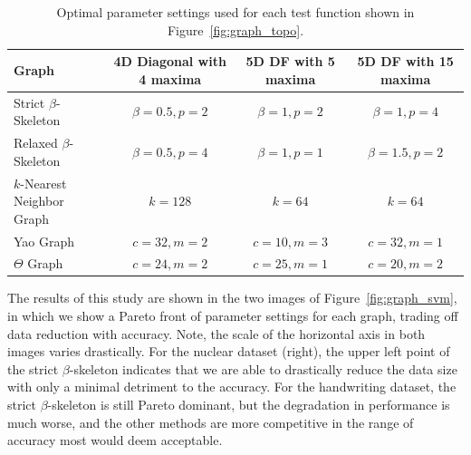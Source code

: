\begin{table}[t]
    \scriptsize
    \centering
    \caption[Optimal graph parameters used in Figure~\ref{fig:graph_topo}]{Optimal parameter settings used for each test function shown in Figure~\ref{fig:graph_topo}.}
    \begin{tabular}{| l | c | c | c |}
    \hline
    \textbf{Graph}  & \textbf{4D Diagonal with 4 maxima} & \textbf{5D DF with 5 maxima} & \textbf{5D DF with 15 maxima} \\
    \hline
    Strict $\beta$-Skeleton & $\beta=0.5, p=2$ & $\beta=1, p=2$  & $\beta=1, p=4$ \\
    Relaxed $\beta$-Skeleton & $\beta=0.5, p=4$ & $\beta=1, p=1$  & $\beta=1.5, p=2$ \\
    $k$-Nearest Neighbor Graph & $k=128$ & $k=64$  & $k=64$ \\
    Yao Graph & $c=32, m=2$ & $c=10, m=3$  & $c=32, m=1$ \\
    $\Theta$ Graph & $c=24, m=2$ & $c=25, m=1$  & $c=20, m=2$ \\
    \hline
    \end{tabular}
    \label{tab:optimal_settings}
\end{table}

The results of this study are shown in the two images of Figure~\ref{fig:graph_svm}, in which we show a Pareto front of parameter settings for each graph, trading off data reduction with accuracy.
%
Note, the scale of the horizontal axis in both images varies drastically.
%
For the nuclear dataset (right), the upper left point of the strict $\beta$-skeleton indicates that we are able to drastically reduce the data size with only a minimal detriment to the accuracy.
%
For the handwriting dataset, the strict $\beta$-skeleton is still Pareto dominant, but the degradation in performance is much worse, and the other methods are more competitive in the range of accuracy most would deem acceptable.

